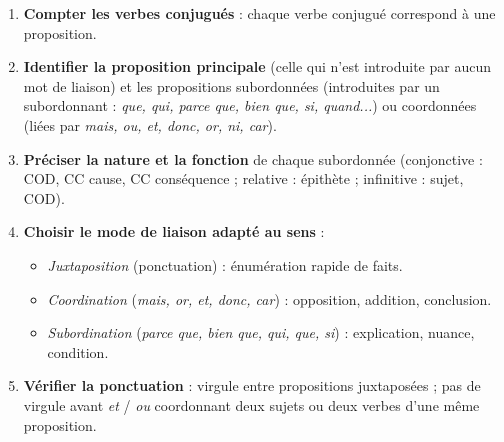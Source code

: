 \documentclass[11pt]{article}
\begin{document}
\begin{methode}
\begin{enumerate}
\item \textbf{Compter les verbes conjugués} : chaque verbe conjugué correspond à une proposition.
\item \textbf{Identifier la proposition principale} (celle qui n'est introduite par aucun mot de liaison) et les propositions subordonnées (introduites par un subordonnant : \emph{que, qui, parce que, bien que, si, quand...}) ou coordonnées (liées par \emph{mais, ou, et, donc, or, ni, car}).
\item \textbf{Préciser la nature et la fonction} de chaque subordonnée (conjonctive : COD, CC cause, CC conséquence ; relative : épithète ; infinitive : sujet, COD).
\item \textbf{Choisir le mode de liaison adapté au sens} :
\begin{itemize}
\item \emph{Juxtaposition} (ponctuation) : énumération rapide de faits.
\item \emph{Coordination} (\emph{mais, or, et, donc, car}) : opposition, addition, conclusion.
\item \emph{Subordination} (\emph{parce que, bien que, qui, que, si}) : explication, nuance, condition.
\end{itemize}
\item \textbf{Vérifier la ponctuation} : virgule entre propositions juxtaposées ; pas de virgule avant \emph{et} / \emph{ou} coordonnant deux sujets ou deux verbes d'une même proposition.
\end{enumerate}
\end{methode}
\end{document}
